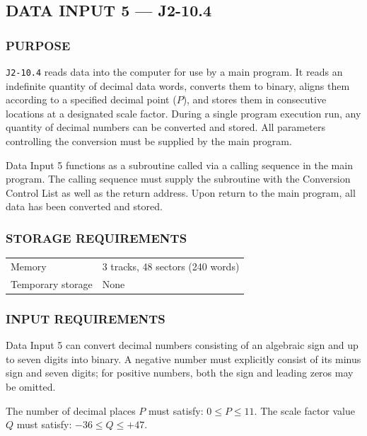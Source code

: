 \subsection*{DATA INPUT 5 --- J2-10.4}
\label{sec:data-input-5}

\subsubsection*{PURPOSE}
\texttt{J2-10.4} reads data into the computer for use by a main program. It reads an indefinite quantity of decimal data words, converts them to binary, aligns them according to a specified decimal point ($P$), and stores them in consecutive locations at a designated scale factor. During a single program execution run, any quantity of decimal numbers can be converted and stored. All parameters controlling the conversion must be supplied by the main program.

Data Input 5 functions as a subroutine called via a calling sequence in the main program. The calling sequence must supply the subroutine with the Conversion Control List as well as the return address. Upon return to the main program, all data has been converted and stored.

\subsubsection*{STORAGE REQUIREMENTS}
\begin{center}
\begin{tabular}{ll}
    \toprule
    Memory & 3 tracks, 48 sectors (240 words) \\
    Temporary storage    & None \\
    \bottomrule
\end{tabular}
\end{center}

\subsubsection*{INPUT REQUIREMENTS}
Data Input 5 can convert decimal numbers consisting of an algebraic sign and up to seven digits into binary. A negative number must explicitly consist of its minus sign and seven digits; for positive numbers, both the sign and leading zeros may be omitted.

The number of decimal places $P$ must satisfy: $0 \le P \le 11$. The scale factor value $Q$ must satisfy: $-36 \le Q \le +47$.

